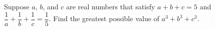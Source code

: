 Suppose $a$, $b$, and $c$ are real numbers that satisfy $a + b + c = 5$ and $\dfrac{1}{a} + \dfrac{1}{b} + \dfrac{1}{c} = \dfrac{1}{5}$. Find the greatest possible value of $a^3 +b^3 +c^3$.
